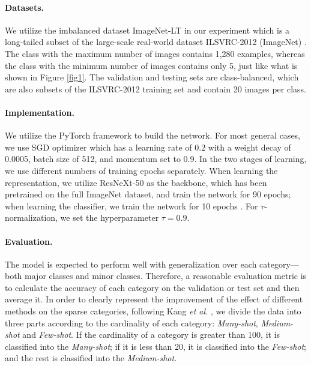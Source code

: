 \documentclass{article}
\begin{document}
\paragraph{Datasets.}We utilize the imbalanced dataset ImageNet-LT \cite{liu2019large} in our experiment which is a long-tailed subset of the large-scale real-world dataset ILSVRC-2012 (ImageNet) \cite{deng2009imagenet}. The class with the maximum number of images contains 1,280 examples, whereas the class with the minimum number of images contains only 5, just like what is shown in Figure \ref{fig1}. The validation and testing sets are class-balanced, which are also subsets of the ILSVRC-2012 training set and contain 20 images per class.

\paragraph{Implementation.}We utilize the PyTorch \cite{NEURIPS2019_bdbca288} framework to build the network. For most general cases, we use SGD optimizer which has a learning rate of 0.2 with a weight decay of 0.0005, batch size of 512, and momentum set to 0.9. In the two stages of learning, we use different numbers of training epochs separately. When learning the representation, we utilize ResNeXt-50 \cite{Xie2016} as the backbone, which has been pretrained on the full ImageNet dataset, and train the network for 90 epochs; when learning the classifier, we train the network for 10 epochs \cite{kang2019decoupling}. For $\tau$-normalization, we set the hyperparameter $\tau=0.9$.

\paragraph{Evaluation.}The model is expected to perform well with generalization over each category---both major classes and minor classes. Therefore, a reasonable evaluation metric is to calculate the accuracy of each category on the validation or test set and then average it. In order to clearly represent the improvement of the effect of different methods on the sparse categories, following Kang \textit{et al.} \cite{kang2019decoupling}, we divide the data into three parts according to the cardinality of each category: \textit{Many-shot}, \textit{Medium-shot} and \textit{Few-shot}. If the cardinality of a category is greater than 100, it is classified into the \textit{Many-shot}; if it is less than 20, it is classified into the \textit{Few-shot}; and the rest is classified into the \textit{Medium-shot}. 
\end{document}
